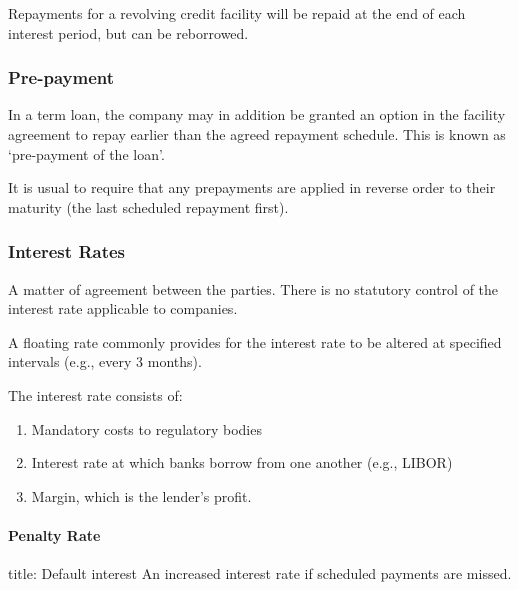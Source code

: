 \documentclass[
]{article}
\newenvironment{Shaded}{}{}
\newcommand{\NormalTok}[1]{#1}
\providecommand{\tightlist}{%
  \setlength{\itemsep}{0pt}\setlength{\parskip}{0pt}}
\begin{document}
Repayments for a revolving credit facility will be repaid at the end of
each interest period, but can be reborrowed.

\hypertarget{pre-payment}{%
\subsubsection{Pre-payment}\label{pre-payment}}

In a term loan, the company may in addition be granted an option in the
facility agreement to repay earlier than the agreed repayment schedule.
This is known as `pre-payment of the loan'.

It is usual to require that any prepayments are applied in reverse order
to their maturity (the last scheduled repayment first).

\hypertarget{interest-rates}{%
\subsubsection{Interest Rates}\label{interest-rates}}

A matter of agreement between the parties. There is no statutory control
of the interest rate applicable to companies.

A floating rate commonly provides for the interest rate to be altered at
specified intervals (e.g., every 3 months).

The interest rate consists of:

\begin{enumerate}
\def\labelenumi{\arabic{enumi}.}
\tightlist
\item
  Mandatory costs to regulatory bodies
\item
  Interest rate at which banks borrow from one another (e.g., LIBOR)
\item
  Margin, which is the lender's profit.
\end{enumerate}

\hypertarget{penalty-rate}{%
\paragraph{Penalty Rate}\label{penalty-rate}}

\begin{Shaded}
\begin{Highlighting}[]
\NormalTok{title: Default interest}
\NormalTok{An increased interest rate if scheduled payments are missed. }
\end{Highlighting}
\end{Shaded}
\end{document}
